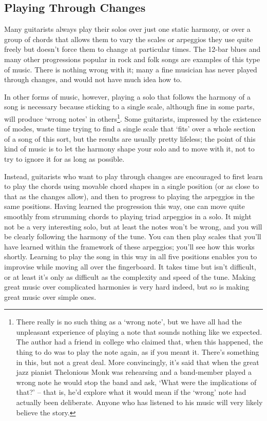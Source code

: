 \documentclass[english]{./gbook}
\begin{document}
\begin{large}
\section{Playing Through Changes}

Many guitarists always play their solos over just one static harmony, or over a group of chords that allows them to vary the scales or arpeggios they use quite freely but doesn't force them to change at particular times. The 12-bar blues and many other progressions popular in rock and folk songs are examples of this type of music. There is nothing wrong with it; many a fine musician has never played through changes, and would not have much idea how to.

In other forms of music, however, playing a solo that follows the harmony of a song is necessary because sticking to a single scale, although fine in some parts, will produce `wrong notes' in others\footnote{There really is no such thing as a `wrong note', but we have all had the unpleasant experience of playing a note that sounds nothing like we expected. The author had a friend in college who claimed that, when this happened, the thing to do was to play the note again, as if you meant it. There's something in this, but not a great deal. More convincingly, it's said that when the great jazz pianist Thelonious Monk was rehearsing and a band-member played a wrong note he would stop the band and ask, `What were the implications of that?' -- that is, he'd explore what it would mean if the `wrong' note had actually been deliberate. Anyone who has listened to his music will very likely believe the story.}. Some guitarists, impressed by the existence of modes, waste time trying to find a single scale that `fits' over a whole section of a song of this sort, but the results are usually pretty lifeless; the point of this kind of music is to let the harmony shape your solo and to move with it, not to try to ignore it for as long as possible.

Instead, guitarists who want to play through changes are encouraged to first learn to play the chords using movable chord shapes in a single position (or as close to that as the changes allow), and then to progress to playing the arpeggios in the same positions. Having learned the progression this way, one can move quite smoothly from strumming chords to playing triad arpeggios in a solo. It might not be a very interesting solo, but at least the notes won't be wrong, and you will be clearly following the harmony of the tune. You can then play scales that you'll have learned within the framework of these arpeggios; you'll see how this works shortly. Learning to play the song in this way in all five positions enables you to improvise while moving all over the fingerboard. It takes time but isn't difficult, or at least it's only as difficult as the complexity and speed of the tune. Making great music over complicated harmonies is very hard indeed, but so is making great music over simple ones. 






\end{large}
\end{document}
